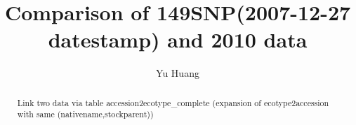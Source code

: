 \documentclass[a3paper,10pt]{article}
\title{Comparison of 149SNP(2007-12-27 datestamp) and 2010 data}
\author{Yu Huang}
\begin{document}
\maketitle

\begin{abstract}
Link two data via table accession2ecotype\_complete (expansion of ecotype2accession with same (nativename,stockparent))
\end{abstract}

\tableofcontents




\end{document}
